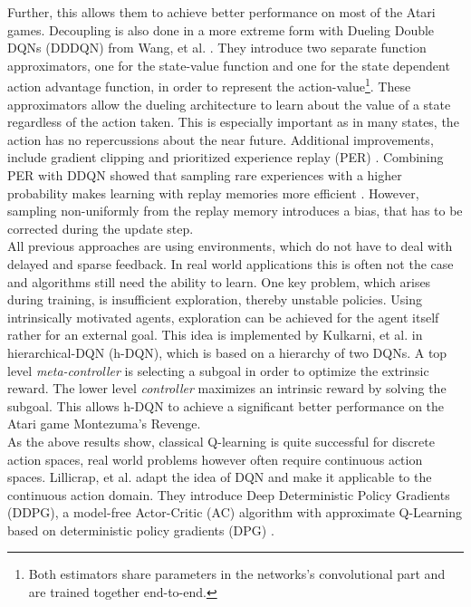 		Further, this allows them to achieve better performance on most of the Atari games. 
		Decoupling is also done in a more extreme form with Dueling Double DQNs (DDDQN) from Wang, et al. \cite{Wang2016}. 
		They introduce two separate function approximators, one for the state-value function and one for the state dependent action advantage function, in order to represent the action-value\footnote{Both estimators share parameters in the networks's convolutional part and are trained together end-to-end.}.
		These approximators allow the dueling architecture to learn about the value of a state regardless of the action taken. 
		This is especially important as in many states, the action has no repercussions about the near future. 
		Additional improvements, include gradient clipping and prioritized experience replay (PER) \cite{Schaul2015}.
		Combining PER with DDQN \cite{Schaul2015} showed that sampling rare experiences with a higher probability makes learning with replay memories more efficient \cite{Lin1992}. 
		However, sampling non-uniformly from the replay memory introduces a bias, that has to be corrected during the update step.\\
		All previous approaches are using environments, which do not have to deal with delayed and sparse feedback.
		In real world applications this is often not the case and algorithms still need the ability to learn.
		One key problem, which arises during training, is insufficient exploration, thereby unstable policies. 
		Using intrinsically motivated agents, exploration can be achieved for the agent itself rather for an external goal. 
		This idea is implemented by Kulkarni, et al. \cite{Kulkarni2016} in hierarchical-DQN (h-DQN), which is based on a hierarchy of two DQNs.
		A top level \textit{meta-controller} is selecting a subgoal in order to optimize the extrinsic reward.
		The lower level \textit{controller} maximizes an intrinsic reward by solving the subgoal.
		This allows h-DQN to achieve a significant better performance on the Atari game Montezuma's Revenge.\\
		As the above results show, classical Q-learning \cite{Watkins1989} is quite successful for discrete action spaces, real world problems however often require continuous action spaces.
		Lillicrap, et al. \cite{Lillicrap2016} adapt the idea of DQN \cite{Mnih2015} and make it applicable to the continuous action domain. 
		They introduce Deep Deterministic Policy Gradients (DDPG), a model-free Actor-Critic (AC) algorithm with approximate Q-Learning based on deterministic policy gradients (DPG) \cite{Silver2014}.
